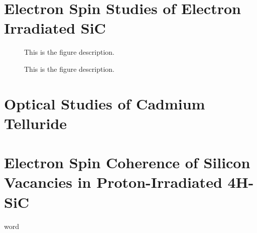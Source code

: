 \documentclass[oneside, astronomy, noacknowlegments]{BYUPhys}
\begin{document}
\begin{appendices}











\chapter{Electron Spin Studies of Electron Irradiated SiC}
\label{chpt:AppendA}

\begin{figure}
    \caption[Electron-irradiated SiC lifetime  summary]{\label{fig:e17results}
     This is the figure description.}
 \end{figure}

\begin{figure}
    \caption[ODMR/Photoluminescence vs temperature]{\label{fig:ODMRPL}
     This is the figure description.}
 \end{figure}











\chapter{Optical Studies of Cadmium Telluride}
\label{chpt:AppendB}









\chapter{Electron Spin Coherence of Silicon Vacancies in Proton-Irradiated 4H-SiC}
\label{chpt:AppendC}

\end{appendices}

word
\cite{RefWorks:doc:58929816e4b0499fa95c51a6}
\cite{RefWorks:doc:58929629e4b0d4c09201f6b8}
\cite{RefWorks:doc:589299f4e4b0d4c09201f915}
\cite{RefWorks:doc:58929128e4b0228a292928a7}
\cite{RefWorks:doc:589299fbe4b0dec22aee3bd8}
\cite{RefWorks:doc:5892912ae4b0dec22aee3993}
\cite{RefWorks:doc:58929128e4b0499fa95c5064}
\cite{RefWorks:doc:5892989ee4b0499fa95c51c8}
\cite{RefWorks:doc:589293f5e4b0dec22aee39de}
\cite{RefWorks:doc:589295fce4b0d4c09201f6b4}
\cite{RefWorks:doc:58929a02e4b0d4c09201f91b}
\cite{RefWorks:doc:589295bde4b0d4c09201f692}
\cite{RefWorks:doc:58929264e4b0d4c09201f63b}
\cite{RefWorks:doc:58929129e4b0d4c09201f61e}
\cite{RefWorks:doc:58929602e4b0d4c09201f6b6}
\cite{RefWorks:doc:589296c6e4b0d4c09201f6f5}
\cite{RefWorks:doc:58929746e4b0dec22aee3a9a}
\cite{RefWorks:doc:589297a9e4b0d4c09201f736}
\cite{RefWorks:doc:58929800e4b0499fa95c51a1}
\cite{RefWorks:doc:589299f0e4b0dec22aee3bd6}
\cite{RefWorks:doc:58929786e4b0228a292929b8}
\cite{RefWorks:doc:58929612e4b0499fa95c50fa}
\cite{RefWorks:doc:5892964ee4b0499fa95c5108}
\cite{RefWorks:doc:58929c15e4b0228a29292c58}
\cite{RefWorks:doc:5892912ae4b0228a292928aa}
\end{document}
